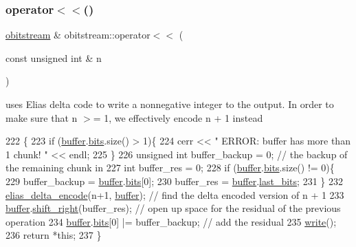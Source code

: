 \subsubsection{\texorpdfstring{operator$<$$<$()}{operator<<()}\hspace{0.1cm}{\footnotesize\ttfamily [1/2]}}
{\footnotesize\ttfamily \hyperlink{classobitstream}{obitstream} \& obitstream\+::operator$<$$<$ (\begin{DoxyParamCaption}\item[{const unsigned int \&}]{n }\end{DoxyParamCaption})}



uses Elias delta code to write a nonnegative integer to the output. In order to make sure that n $>$= 1, we effectively encode n + 1 instead 


\begin{DoxyCode}
222                                                          \{
223   \textcolor{keywordflow}{if} (\hyperlink{classobitstream_aeaccad00a395a404aa16472bfa052be3}{buffer}.\hyperlink{classbit__pipe_a86f38af1e9736b053728033490476b50}{bits}.size() > 1)\{
224     cerr << \textcolor{stringliteral}{" ERROR: buffer has more than 1 chunk! "} << endl;
225   \}
226   \textcolor{keywordtype}{unsigned} \textcolor{keywordtype}{int} buffer\_backup = 0; \textcolor{comment}{// the backup of the remaining chunk in }
227   \textcolor{keywordtype}{int} buffer\_res = 0; 
228   \textcolor{keywordflow}{if} (\hyperlink{classobitstream_aeaccad00a395a404aa16472bfa052be3}{buffer}.\hyperlink{classbit__pipe_a86f38af1e9736b053728033490476b50}{bits}.size() != 0)\{
229     buffer\_backup = \hyperlink{classobitstream_aeaccad00a395a404aa16472bfa052be3}{buffer}.\hyperlink{classbit__pipe_a86f38af1e9736b053728033490476b50}{bits}[0];
230     buffer\_res = \hyperlink{classobitstream_aeaccad00a395a404aa16472bfa052be3}{buffer}.\hyperlink{classbit__pipe_a0f3e84b02751803adaab499b5dad86fe}{last\_bits};
231   \}
232   \hyperlink{bitstream_8cpp_a63daa014203b9a5b2622a264cbfdff7b}{elias\_delta\_encode}(n+1, \hyperlink{classobitstream_aeaccad00a395a404aa16472bfa052be3}{buffer}); \textcolor{comment}{// find the delta encoded version of n + 1 }
233   \hyperlink{classobitstream_aeaccad00a395a404aa16472bfa052be3}{buffer}.\hyperlink{classbit__pipe_a341a1f62d728a67f730503ca722a7770}{shift\_right}(buffer\_res); \textcolor{comment}{// open up space for the residual of the previous
       operation}
234   \hyperlink{classobitstream_aeaccad00a395a404aa16472bfa052be3}{buffer}.\hyperlink{classbit__pipe_a86f38af1e9736b053728033490476b50}{bits}[0] |= buffer\_backup; \textcolor{comment}{// add the residual}
235   \hyperlink{classobitstream_a5ac23633932baad040856f0a33ee1ebf}{write}();
236   \textcolor{keywordflow}{return} *\textcolor{keyword}{this};
237 \}
\end{DoxyCode}
\mbox{\label{classobitstream_aed715e98e8b47e19e465da1445372229}} 
